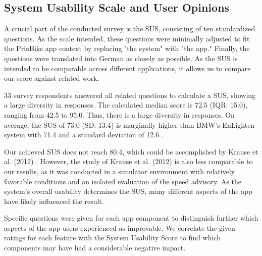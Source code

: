 \subsection{System Usability Scale and User Opinions}

A crucial part of the conducted survey is the SUS, consisting of ten standardized questions. As the scale intended, these questions were minimally adjusted to fit the PrioBike app context by replacing "the system" with "the app." Finally, the questions were translated into German as closely as possible. As the SUS is intended to be comparable across different applications, it allows us to compare our score against related work. 

33 survey respondents answered all related questions to calculate a SUS, showing a large diversity in responses. The calculated median score is 72.5 (IQR: 15.0), ranging from 42.5 to 95.0. Thus, there is a large diversity in responses. On average, the SUS of 73.0 (SD: 13.4) is marginally higher than BMW's EnLighten system with 71.4 and a standard deviation of 12.6 \cite{wilson_driver_2017}. 

Our achieved SUS does not reach 80.4, which could be accomplished by Krause et al. (2012) \cite{krause_traffic_2012}. However, the study of Krause et al. (2012) \cite{krause_traffic_2012} is also less comparable to our results, as it was conducted in a simulator environment with relatively favorable conditions and an isolated evaluation of the speed advisory. As the system's overall usability determines the SUS, many different aspects of the app have likely influenced the result.

Specific questions were given for each app component to distinguish further which aspects of the app users experienced as improvable. We correlate the given ratings for each feature with the System Usability Score to find which components may have had a considerable negative impact.

